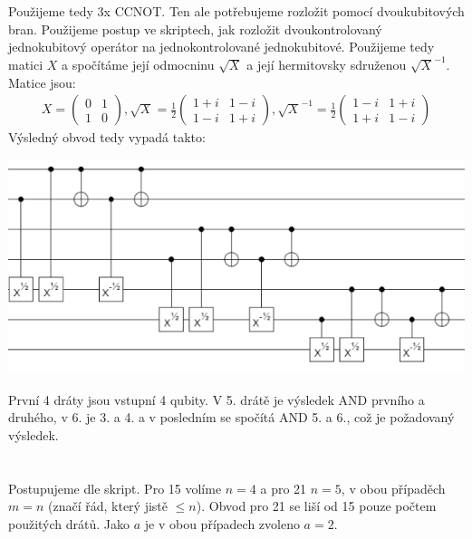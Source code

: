 \documentclass[12pt, a4paper]{article}
\begin{document}
Použijeme tedy 3x CCNOT. Ten ale potřebujeme rozložit pomocí dvoukubitových bran. Použijeme postup ve skriptech, jak rozložit dvoukontrolovaný jednokubitový operátor na jednokontrolované jednokubitové. Použijeme tedy matici $X$ a spočítáme její odmocninu $\sqrt{X}$ a její hermitovsky sdruženou $\sqrt{X}^{-1}$. Matice jsou:
\begin{gather*}
X = \begin{pmatrix}
0 & 1\\
1 & 0
\end{pmatrix}, 
\sqrt{X} = \frac{1}{2}\begin{pmatrix}
1+i & 1-i\\
1-i & 1+i
\end{pmatrix},
\sqrt{X}^{-1} = \frac{1}{2}\begin{pmatrix}
1-i & 1+i\\
1+i & 1-i
\end{pmatrix}
\end{gather*}
Výsledný obvod tedy vypadá takto:
\begin{center}
\includegraphics{3/AND.png}
\end{center}

První 4 dráty jsou vstupní 4 qubity. V 5. drátě je výsledek AND prvního a druhého, v 6. je 3. a 4. a v posledním se spočítá AND 5. a 6., což je požadovaný výsledek.

\section{}
Postupujeme dle skript. Pro 15 volíme $n=4$ a pro 21 $n=5$, v obou případěch $m=n$ (značí řád, který jistě $\leq n$). Obvod pro 21 se liší od 15 pouze počtem použitých drátů. Jako $a$ je v obou případech zvoleno $a=2$.
\end{document}
